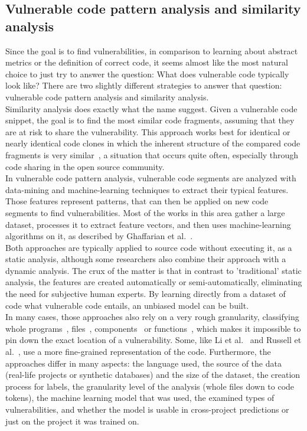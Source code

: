 \documentclass[
a4paper,
pagesize,
pdftex,
12pt,
ngerman,
fleqn,
final,
]{scrartcl}
\begin{document}
	\subsection{Vulnerable code pattern analysis and similarity analysis}\label{pattern}
	Since the goal is to find vulnerabilities, in comparison to learning about abstract metrics or the definition of correct code, it seems almost like the most natural choice to just try to answer the question: What does vulnerable code typically look like? There are two slightly different strategies to answer that question: vulnerable code pattern analysis and similarity analysis.\\
	Similarity analysis does exactly what the name suggest. Given a vulnerable code snippet, the goal is to find the most similar code fragments, assuming that they are at risk to share the vulnerability. This approach works best for identical or nearly identical code clones in which the inherent structure of the compared code fragments is very similar~\cite{Li.2018}, a situation that occurs quite often, especially through code sharing in the open source community.\\
	In vulnerable code pattern analysis, vulnerable code segments are analyzed with data-mining and machine-learning techniques to extract their typical features. Those features represent patterns, that can then be applied on new code segments to find vulnerabilities. Most of the works in this area gather a large dataset, processes it to extract feature vectors, and then uses machine-learning algorithms on it, as described by Ghaffarian et al.~\cite{Ghaffarian.2017}.\\
	Both approaches are typically applied to source code without executing it, as a static analysis, although some researchers also combine their approach with a dynamic analysis. The crux of the matter is that in contrast to 'traditional' static analysis, the features are created automatically or semi-automatically, eliminating the need for subjective human experts. By learning directly from a dataset of code what vulnerable code entails, an unbiased model can be built.\\	
	In many cases, those approaches also rely on a very rough granularity, classifying whole programs~\cite{Grieco.2016}, files~\cite{Shin.2010}, components~\cite{Neuhaus.2007} or functions~\cite{Yamaguchi.2011}, which makes it impossible to pin down the exact location of a vulnerability. Some, like Li et al.~\cite{Li.2018} and Russell et al.~\cite{Russell.2018}, use a more fine-grained representation of the code. Furthermore, the approaches differ in many aspects: the language used, the source of the data (real-life projects or synthetic databases) and the size of the dataset, the creation process for labels, the granularity level of the analysis (whole files down to code tokens), the machine learning model that was used, the examined types of vulnerabilities, and whether the model is usable in cross-project predictions or just on the project it was trained on. \\
\end{document}
